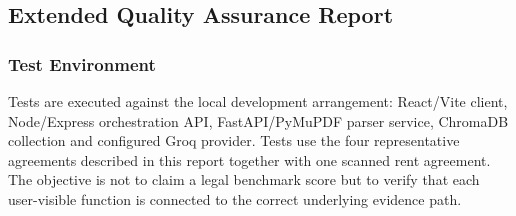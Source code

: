 \documentclass[12pt,a4paper,oneside]{report}
\begin{document}
\subsection{Extended Quality Assurance Report}

\subsubsection{Test Environment}
Tests are executed against the local development arrangement: React/Vite client, Node/Express orchestration API, FastAPI/PyMuPDF parser service, ChromaDB collection and configured Groq provider. Tests use the four representative agreements described in this report together with one scanned rent agreement. The objective is not to claim a legal benchmark score but to verify that each user-visible function is connected to the correct underlying evidence path.
\end{document}

